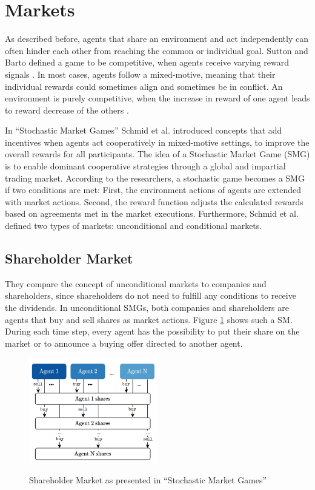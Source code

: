 \section{Markets}\label{market}
As described before, agents that share an environment and act independently can often hinder each other from reaching the common or individual goal. Sutton and Barto defined a game to be competitive, when agents receive varying reward signals \cite{suba18}. In most cases, agents follow a mixed-motive, meaning that their individual rewards could sometimes align and sometimes be in conflict. An environment is purely competitive, when the increase in reward of one agent leads to reward decrease of the others \cite{scbe21}.

In ``Stochastic Market Games'' \cite{scbe21} Schmid et al. introduced concepts that add incentives when agents act cooperatively in mixed-motive settings, to improve the overall rewards for all participants. The idea of a Stochastic Market Game (SMG) is to enable dominant cooperative strategies through a global and impartial trading market. According to the researchers, a stochastic game becomes a SMG if two conditions are met: First, the environment actions of agents are extended with market actions. Second, the reward function adjusts the calculated rewards based on agreements met in the market executions. Furthermore, Schmid et al. defined two types of markets: unconditional and conditional markets.

\subsection{Shareholder Market}
They compare the concept of unconditional markets to companies and shareholders, since shareholders do not need to fulfill any conditions to receive the dividends. In unconditional SMGs, both companies and shareholders are agents that buy and sell shares as market actions. Figure \ref{fig:sm} shows such a SM. During each time step, every agent has the possibility to put their share on the market or to announce a buying offer directed to another agent.

\begin{figure}[hpbt]
    \centering
    \includegraphics[width=0.5\textwidth]{pictures/SMG_sm}\\
    \caption[Shareholder Market]{Shareholder Market as presented in ``Stochastic Market Games'' \cite{scbe21}}\label{fig:sm}
\end{figure}

